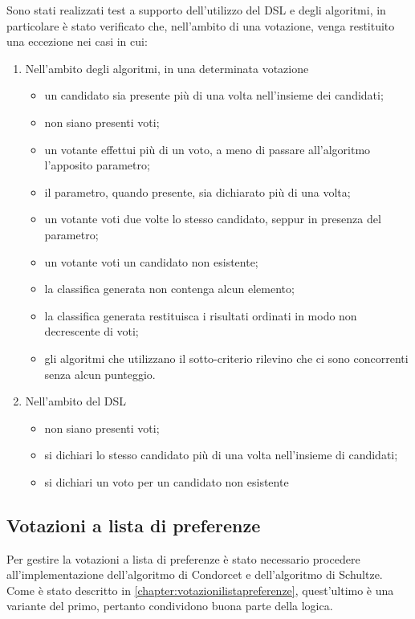 \documentclass[12pt,a4paper,openright,twoside]{book}
\begin{document}
Sono stati realizzati test a supporto dell'utilizzo del DSL e degli algoritmi, in particolare è stato verificato che, nell'ambito di una votazione, venga 
restituito una eccezione nei casi in cui: 
\begin{enumerate}
    \item{Nell'ambito degli algoritmi, in una determinata votazione
        \begin{itemize}
        \item{un candidato sia presente più di una volta nell'insieme dei candidati;}
        \item{non siano presenti voti;}
        \item{un votante effettui più di un voto, a meno di passare all'algoritmo l'apposito parametro;}
        \item{il parametro, quando presente, sia dichiarato più di una volta;}
        \item{un votante voti due volte lo stesso candidato, seppur in presenza del parametro;}
        \item{un votante voti un candidato non esistente;}
        \item{la classifica generata non contenga alcun elemento;}
        \item{la classifica generata restituisca i risultati ordinati in modo non decrescente di voti;}
        \item{gli algoritmi che utilizzano il sotto-criterio rilevino che ci sono concorrenti senza alcun punteggio.}
        \end{itemize}}
    \item{Nell'ambito del DSL
        \begin{itemize}
            \item{non siano presenti voti;}
            \item{si dichiari lo stesso candidato più di una volta nell'insieme di candidati;}
            \item{si dichiari un voto per un candidato non esistente}
        \end{itemize}
    }

\end{enumerate}

\subsection{Votazioni a lista di preferenze}
Per gestire la votazioni a lista di preferenze è stato necessario procedere all'implementazione dell'algoritmo di
Condorcet e dell'algoritmo di Schultze. Come è stato descritto in \ref{chapter:votazionilistapreferenze}, quest'ultimo
è una variante del primo, pertanto condividono buona parte della logica.
\end{document}
